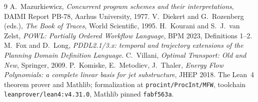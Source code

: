 \documentclass[11pt]{article}
\theoremstyle{plain}
\theoremstyle{definition}
\begin{document}
\begin{thebibliography}{9}
 A.~Mazurkiewicz, \emph{Concurrent program schemes and
their interpretations}, DAIMI Report PB-78, Aarhus University, 1977.
 V.~Diekert and G.~Rozenberg (eds.), \emph{The Book of
Traces}, World Scientific, 1995.
 H.~Kourani and S.~J.~van Zelst, \emph{POWL: Partially Ordered
Workflow Language}, BPM 2023, Definitions 1--2.
 M.~Fox and D.~Long, \emph{PDDL2.1/3.x: temporal and
trajectory extensions of the Planning Domain Definition Language}.
 C.~Villani, \emph{Optimal Transport: Old and New},
Springer, 2009.
 P.~Komiske, E.~Metodiev, J.~Thaler, \emph{Energy Flow
Polynomials: a complete linear basis for jet substructure}, JHEP 2018.
 The Lean~4 theorem prover and Mathlib; formalization at
\texttt{procint/ProcInt/MFW}, toolchain \texttt{leanprover/lean4:v4.31.0},
Mathlib pinned \texttt{fabf563a}.
\end{thebibliography}
\end{document}
